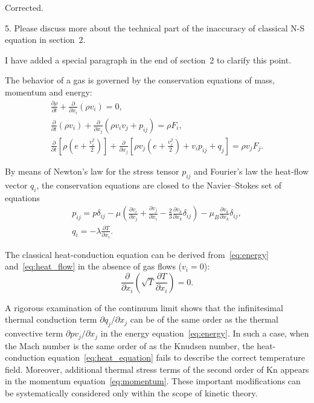 \documentclass{article}
\newcommand{\Kn}{\mathrm{Kn}}
\newcommand{\pder}[2][]{\frac{\partial#1}{\partial#2}}
\newcommand{\Pder}[2][]{\partial#1/\partial#2}
\def\asterism{\par\vspace{1em}{\centering\scalebox{1}{\bfseries *~*~*}\par}\vspace{.5em}\par}
\begin{document}
Corrected.

\begin{quoting}
5. Please discuss more about the technical part of the inaccuracy of
classical N-S equation in section~2.
\end{quoting}

I have added a special paragraph in the end of section~2 to clarify this point.

\begin{leftbar}
The behavior of a gas is governed by the conservation equations of mass, momentum and energy:
\begin{gather}
	\pder[\rho]{t} + \pder{x_i}(\rho v_i) = 0, \label{eq:mass}\\
	\pder{t}(\rho v_i) + \pder{x_j}(\rho v_i v_j + p_{ij}) = \rho F_i, \label{eq:momentum}\\
	\pder{t}\left[\rho\left(e+\frac{v_i^2}2\right)\right] +
		\pder{x_j}\left[\rho v_j\left(e+\frac{v_i^2}2\right)+v_i p_{ij}+q_j\right] = \rho v_j F_j. \label{eq:energy}
\end{gather}

\asterism

By means of Newton's law for the stress tensor \(p_{ij}\) and Fourier's law the heat-flow vector \(q_i\),
the conservation equations are closed to the Navier--Stokes set of equations
\begin{gather}
	p_{ij} = p\delta_{ij} - \mu\left(\pder[v_i]{x_j}+\pder[v_j]{x_i}-\frac23\pder[v_k]{x_k}\delta_{ij}\right) -
		\mu_B\pder[v_k]{x_k}\delta_{ij}, \label{eq:stress_tensor}\\
	q_i = -\lambda\pder[T]{x_i}. \label{eq:heat_flow}
\end{gather}

\asterism

The classical heat-conduction equation
can be derived from~\eqref{eq:energy} and~\eqref{eq:heat_flow}
in the absence of gas flows (\(v_i = 0\)):
\begin{equation}\label{eq:heat_equation}
	\pder{x_i}\left(\sqrt{T}\pder[T]{x_i}\right) = 0.
\end{equation}

\asterism

A rigorous examination of the continuum limit shows that the
infinitesimal thermal conduction term \(\Pder[q_j]{x_j}\) can be of the
same order as the thermal convective term \(\Pder[pv_j]{x_j}\) in the
energy equation~\eqref{eq:energy}. In such a case, when the Mach number
is the same order of as the Knudsen number, the heat-conduction
equation~\eqref{eq:heat_equation} fails to describe the correct
temperature field. Moreover, additional thermal stress terms of the
second order of \(\Kn\) appears in the momentum
equation~\eqref{eq:momentum}. These important modifications can be
systematically considered only within the scope of kinetic theory.
\end{leftbar}
\end{document}
